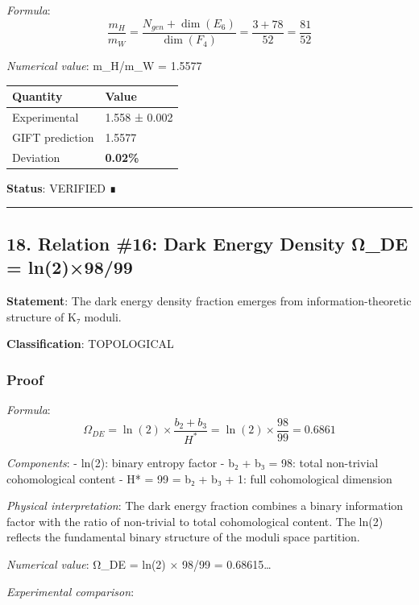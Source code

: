 \documentclass[11pt,a4paper]{article}
\begin{document}
\emph{Formula}:
\[\frac{m_H}{m_W} = \frac{N_{gen} + \dim(E_6)}{\dim(F_4)} = \frac{3 + 78}{52} = \frac{81}{52}\]

\emph{Numerical value}: m\_H/m\_W = 1.5577

{\def\LTcaptype{none} %
\begin{longtable}[]{@{}ll@{}}
\toprule\noalign{}
Quantity & Value \\
\midrule\noalign{}
\endhead
\bottomrule\noalign{}
\endlastfoot
Experimental & 1.558 ± 0.002 \\
GIFT prediction & 1.5577 \\
Deviation & \textbf{0.02\%} \\
\end{longtable}
}

\textbf{Status}: VERIFIED ∎

\begin{center}\rule{0.5\linewidth}{0.5pt}\end{center}

\subsection{18. Relation \#16: Dark Energy Density Ω\_DE = ln(2)×98/99}\label{relation-16-dark-energy-density-ux3c9_de-ln29899}

\textbf{Statement}: The dark energy density fraction emerges from information-theoretic structure of K₇ moduli.

\textbf{Classification}: TOPOLOGICAL

\subsubsection{Proof}\label{proof-20}

\emph{Formula}:
\[\Omega_{DE} = \ln(2) \times \frac{b_2 + b_3}{H^*} = \ln(2) \times \frac{98}{99} = 0.6861\]

\emph{Components}:
- ln(2): binary entropy factor
- b₂ + b₃ = 98: total non-trivial cohomological content
- H* = 99 = b₂ + b₃ + 1: full cohomological dimension

\emph{Physical interpretation}:
The dark energy fraction combines a binary information factor with the ratio of non-trivial to total cohomological content. The ln(2) reflects the fundamental binary structure of the moduli space partition.

\emph{Numerical value}: Ω\_DE = ln(2) × 98/99 = 0.68615\ldots{}

\emph{Experimental comparison}:
\end{document}
